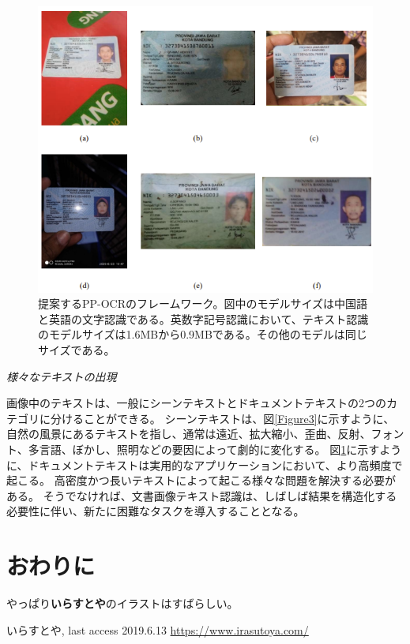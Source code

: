\documentclass[uplatex, twocolumn,10pt]{jsarticle}
\begin{document}
\begin{figure}[t]
    \begin{center}
        \includegraphics*{image/Figure4.png}
        \caption{提案するPP-OCRのフレームワーク。図中のモデルサイズは中国語と英語の文字認識である。英数字記号認識において、テキスト認識のモデルサイズは1.6MBから0.9MBである。その他のモデルは同じサイズである。}
        \label{Figure2}
    \end{center}
\end{figure}


\emph{様々なテキストの出現}

画像中のテキストは、一般にシーンテキストとドキュメントテキストの2つのカテゴリに分けることができる。
シーンテキストは、図\ref{Figure3}に示すように、自然の風景にあるテキストを指し、通常は遠近、拡大縮小、歪曲、反射、フォント、多言語、ぼかし、照明などの要因によって劇的に変化する。
図\ref{}に示すように、ドキュメントテキストは実用的なアプリケーションにおいて、より高頻度で起こる。
高密度かつ長いテキストによって起こる様々な問題を解決する必要がある。
そうでなければ、文書画像テキスト認識は、しばしば結果を構造化する必要性に伴い、新たに困難なタスクを導入することとなる。





\section{おわりに}
やっぱり{\bf いらすとや}のイラストはすばらしい。

\begin{thebibliography}{99}
     いらすとや, last access 2019.6.13 \url{https://www.irasutoya.com/}



\end{thebibliography}
\end{document}
